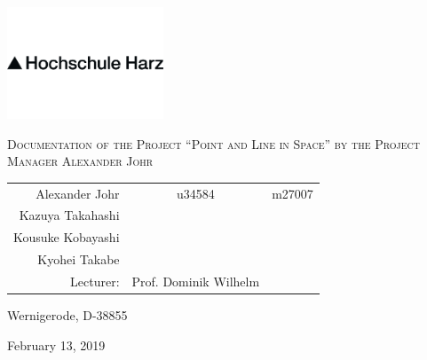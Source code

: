 

\pagestyle{empty}
\clearpage

\newcommand*{\titleUL}{\begingroup%
\begin{center}

\includegraphics[width=0.35\textwidth]{img/hsharz/logo.png}

\LARGE{\textsc{Documentation of the Project ``Point and Line in Space'' by the Project Manager Alexander Johr}}
\vspace{0.8\baselineskip}

\vfill


\vfill

\normalsize


\begin{tabular}{r c l}
Alexander Johr & u34584 & m27007 \\
Kazuya Takahashi \\
Kousuke Kobayashi \\
Kyohei Takabe  \\

\hline
Lecturer: &  Prof. Dominik Wilhelm & \\
\end{tabular}











\vfill

Wernigerode, D-38855

\large 
February 13, 2019

\end{center}

\endgroup}

\titleUL
